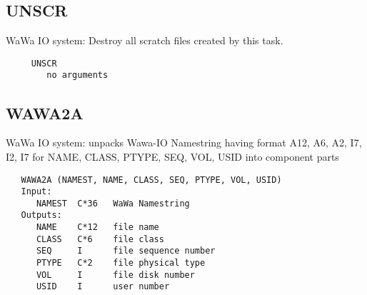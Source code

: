 \subsection{UNSCR}
WaWa IO system: Destroy all scratch files created by this task.

\begin{verbatim}
     UNSCR
        no arguments

\end{verbatim}

\subsection{WAWA2A}
WaWa IO system: unpacks Wawa-IO Namestring having format A12, A6, A2,
I7, I2, I7 for NAME, CLASS, PTYPE, SEQ, VOL, USID into component parts
\begin{verbatim}
   WAWA2A (NAMEST, NAME, CLASS, SEQ, PTYPE, VOL, USID)
   Input:
      NAMEST  C*36   WaWa Namestring
   Outputs:
      NAME    C*12   file name
      CLASS   C*6    file class
      SEQ     I      file sequence number
      PTYPE   C*2    file physical type
      VOL     I      file disk number
      USID    I      user number

\end{verbatim}
